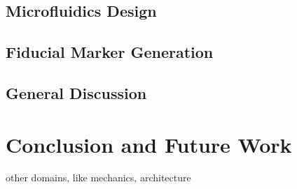 \documentclass{article}
\begin{document}
\subsection{Microfluidics Design}

\subsection{Fiducial Marker Generation}

\subsection{General Discussion}

\section{Conclusion and Future Work}
other domains, like mechanics, architecture

\printbibliography %
\end{document}

